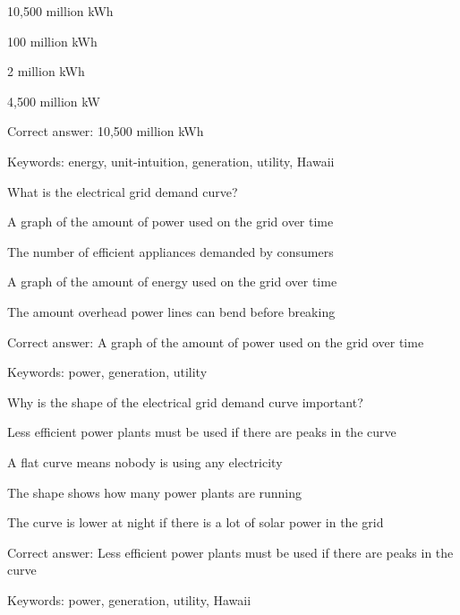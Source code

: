 \begin{answer}
	\item 10,500 million kWh
	\item 100 million kWh
	\item 2 million kWh
	\item 4,500 million kW
\end{answer}

Correct answer: 10,500 million kWh

Keywords: energy, unit-intuition, generation, utility, Hawaii

\begin{question}
	\item What is the electrical grid demand curve?
\end{question}

\begin{answer}
	\item A graph of the amount of power used on the grid over time
	\item The number of efficient appliances demanded by consumers
	\item A graph of the amount of energy used on the grid over time
	\item The amount overhead power lines can bend before breaking
\end{answer}

Correct answer: A graph of the amount of power used on the grid over time

Keywords: power, generation, utility

\begin{question}
	\item Why is the shape of the electrical grid demand curve important?
\end{question}

\begin{answer}
	\item Less efficient power plants must be used if there are peaks in the curve 
	\item A flat curve means nobody is using any electricity
	\item The shape shows how many power plants are running
	\item The curve is lower at night if there is a lot of solar power in the grid
\end{answer}

Correct answer: Less efficient power plants must be used if there are peaks in the curve

Keywords: power, generation, utility, Hawaii

